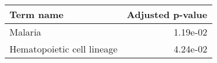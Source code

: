\begin{tabular}{lr}
\toprule
                  Term name &  Adjusted p-value \\
\midrule
                    Malaria &          1.19e-02 \\
 Hematopoietic cell lineage &          4.24e-02 \\
\bottomrule
\end{tabular}

